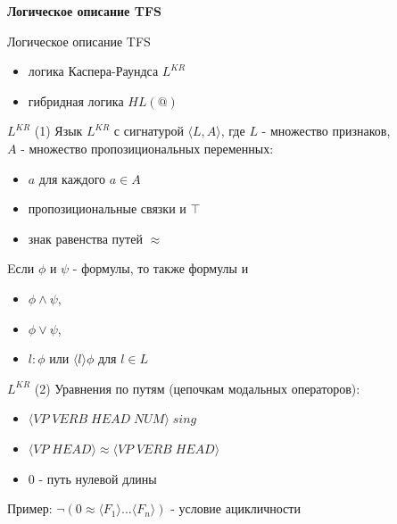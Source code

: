 \documentclass{beamer}
\begin{document}
\begin{frame}{}
\begin{center}
	\textbf{Логическое описание TFS}
\end{center}
\end{frame}

\begin{frame}{Логическое описание TFS}
\begin{itemize}
	\item логика Каспера-Раундса $L^{KR}$
	\item гибридная логика $HL(@)$
\end{itemize}
\end{frame}

\begin{frame}{$L^{KR}$ (1)}
Язык $L^{KR}$ с сигнатурой $\langle L, A \rangle$, где $L$ - множество признаков, \\$A$ - множество пропозициональных переменных:\\
\bigskip
\begin{itemize}
	\item $a$ для каждого $a \in A$
	\item пропозициональные связки и $\top$
	\item знак равенства путей $\approx$
\end{itemize}
\bigskip	
Eсли $\phi$ и $\psi$ - формулы, то также формулы и 
\begin{itemize}
	\item $\phi \wedge \psi$,
	\item $\phi \vee \psi$,
	\item $l : \phi$ или $\langle l \rangle \phi$ для $l \in L$
\end{itemize}
\end{frame}

\begin{frame}{$L^{KR}$ (2)}
Уравнения по путям (цепочкам модальных операторов):\\
\bigskip
\begin{itemize}
	\item $\langle VP \; VERB \; HEAD \; NUM \rangle \; sing$
	\item $\langle VP \; HEAD \rangle \approx \langle VP \; VERB \; HEAD \rangle$
	\item $0$ - путь нулевой длины
\end{itemize}
\bigskip
Пример: $\neg(0 \approx \langle F_1 \rangle ... \langle F_n \rangle)$ - условие ацикличности
\end{frame}
\end{document}
